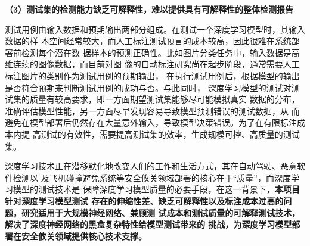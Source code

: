 \textbf{（3）测试集的检测能力缺乏可解释性，难以提供具有可解释性的整体检测报告}

测试用例由输入数据和预期输出两部分组成。在测试一个深度学习模型时，其输入数据的样
本空间经常较大，而人工标注测试预言的成本较高，因此很难在系统部署前检测每个潜在数
据样本的预测正确性。比如图片分类任务中，输入数据是高维连续的图像数据，而目前对图
像的自动标注研究尚在起步阶段，通常需要人工标注图片的类别作为测试用例的预期输出，
在执行测试用例后，根据模型的输出是否符合预期来判断测试用例的成功与否。与此同时，
深度学习模型的测试对测试集的质量有较高要求，即一方面期望测试集能够尽可能模拟真实
数据的分布，准确评估模型性能，另一方面尽早发现容易导致模型预测错误的测试数据，从
而避免在模型部署后仍然存在大量意外输入，导致模型决策错误。为了在有限标注成本内提
高测试的有效性，需要提高测试集的效率，生成规模可控、高质量的测试集。


深度学习技术正在潜移默化地改变人们的工作和生活方式，其在自动驾驶、恶意软件检测以
及飞机碰撞避免系统等安全攸关领域部署的核心在于“质量”，而深度学习模型的测试技术是
保障深度学习模型质量的必要手段，在这一背景下，\textbf{本项目针对深度学习模型测试
存在的伸缩性差、缺乏可解释性以及标注成本过高的问题，研究适用于大规模神经网络、兼顾测
试成本和测试质量的可解释测试技术，解决了深度神经网络的黑盒复杂特性给模型测试带来的
挑战，为深度学习模型部署在安全攸关领域提供核心技术支撑。}


